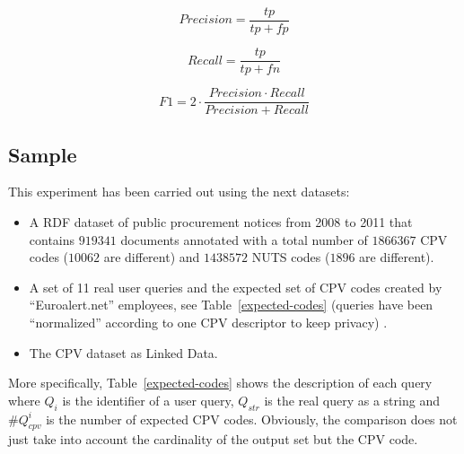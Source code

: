 \begin{figure}[ht]
\begin{minipage}[b]{0.45\linewidth}
\centering
\begin{equation}\label{eq-1}
Precision = \frac{tp}{tp+fp} 
\end{equation}
\end{minipage}
\hspace{0.5cm}
\begin{minipage}[b]{0.45\linewidth}
\centering
\begin{equation}\label{eq-2}
Recall = \frac{tp}{tp+fn}
\end{equation}
\end{minipage}
\end{figure}


\begin{equation}\label{eq-3}
F1 = 2 \cdot \frac{Precision \cdot Recall}{ Precision + Recall}
\end{equation}


\subsection{Sample}
This experiment has been carried out using the next datasets:
\begin{itemize}
\item A RDF dataset of public procurement notices from 2008 to 2011 that contains $919341$ documents annotated with 
a total number of $1866367$ CPV codes ($10062$ are different) and $1438572$ NUTS codes ($1896$ are different).
\item A set of 11 real user queries and the expected set of CPV codes created by ``Euroalert.net'' employees, see Table~\ref{expected-codes} 
(queries have been ``normalized'' according to one CPV descriptor to keep privacy) .
\item The CPV dataset as Linked Data.
\end{itemize}

More specifically, Table~\ref{expected-codes} shows the description of each query where $Q_{i}$ is the identifier 
of a user query, $Q_{str}$ is the real query as a string and $\#Q^{i}_{cpv}$ is the number of expected CPV codes. Obviously, the comparison 
does not just take into account the cardinality of the output set but the CPV code.

